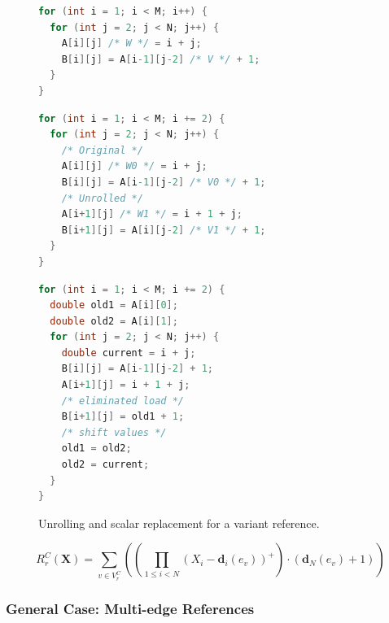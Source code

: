 \begin{figure}[H]
  \centering
  \begin{minipage}[t]{\textwidth}
\begin{lstlisting}[language=C,
  caption={Original loop with a variant reference},
  label={lst:ck94-register-variant-original}]
for (int i = 1; i < M; i++) {
  for (int j = 2; j < N; j++) {
    A[i][j] /* W */ = i + j;
    B[i][j] = A[i-1][j-2] /* V */ + 1;
  }
}
\end{lstlisting}
  \end{minipage}
  \par\medskip
  \begin{minipage}[t]{0.48\textwidth}
\begin{lstlisting}[language=C, basicstyle=\ttfamily\scriptsize,
  caption={Variant-reference loop after unrolling},
  label={lst:ck94-register-variant-unrolled}]
for (int i = 1; i < M; i += 2) {
  for (int j = 2; j < N; j++) {
    /* Original */
    A[i][j] /* W0 */ = i + j;
    B[i][j] = A[i-1][j-2] /* V0 */ + 1;
    /* Unrolled */
    A[i+1][j] /* W1 */ = i + 1 + j;
    B[i+1][j] = A[i][j-2] /* V1 */ + 1;
  }
}
\end{lstlisting}
  \end{minipage}%
  \hfill
  \begin{minipage}[t]{0.48\textwidth}
\begin{lstlisting}[language=C, basicstyle=\ttfamily\scriptsize,
  caption={Unrolled loop after scalar replacement},
  label={lst:ck94-register-variant-replaced}]
for (int i = 1; i < M; i += 2) {
  double old1 = A[i][0];
  double old2 = A[i][1];
  for (int j = 2; j < N; j++) {
    double current = i + j;
    B[i][j] = A[i-1][j-2] + 1;
    A[i+1][j] = i + 1 + j;
    /* eliminated load */
    B[i+1][j] = old1 + 1;
    /* shift values */
    old1 = old2;
    old2 = current;
  }
}
\end{lstlisting}
  \end{minipage}
  \caption{Unrolling and scalar replacement for a variant reference.}
  \label{fig:ck94-variant-register-example}
\end{figure}


\begin{equation}
  R^{C}_{r}(\mathbf{X}) =
  \sum_{v \in V^{C}_{r}} \left(
    \left(\prod_{1 \le i < N}
      \left(X_{i} - \mathbf{d}_{i}(e_{v})\right)^{+}\right)
    \cdot \left(\mathbf{d}_{N}(e_{v}) + 1\right)
    \right)
\end{equation}

\subsubsection{General Case: Multi-edge References}


